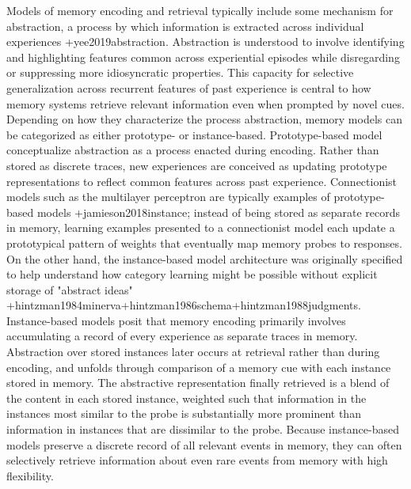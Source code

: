 Models of memory encoding and retrieval typically include some mechanism for abstraction, a process by which information is extracted across individual experiences +{}{}{yee2019abstraction}. Abstraction is understood to involve identifying and highlighting features common across experiential episodes while disregarding or suppressing more idiosyncratic properties. This capacity for selective generalization across recurrent features of past experience is central to how memory systems retrieve relevant information even when prompted by novel cues.\markdownRendererInterblockSeparator
{}Depending on how they characterize the process abstraction, memory models can be categorized as either prototype- or instance-based. Prototype-based model conceptualize abstraction as a process enacted during encoding. Rather than stored as discrete traces, new experiences are conceived as updating prototype representations to reflect common features across past experience. Connectionist models such as the multilayer perceptron are typically examples of prototype-based models +{}{}{jamieson2018instance}; instead of being stored as separate records in memory, learning examples presented to a connectionist model each update a prototypical pattern of weights that eventually map memory probes to responses.\markdownRendererInterblockSeparator
{}On the other hand, the instance-based model architecture was originally specified to help understand how category learning might be possible without explicit storage of "abstract ideas" +{}{}{hintzman1984minerva}+{}{}{hintzman1986schema}+{}{}{hintzman1988judgments}. Instance-based models posit that memory encoding primarily involves accumulating a record of every experience as separate traces in memory. Abstraction over stored instances later occurs at retrieval rather than during encoding, and unfolds through comparison of a memory cue with each instance stored in memory. The abstractive representation finally retrieved is a blend of the content in each stored instance, weighted such that information in the instances most similar to the probe is substantially more prominent than information in instances that are dissimilar to the probe. Because instance-based models preserve a discrete record of all relevant events in memory, they can often selectively retrieve information about even rare events from memory with high flexibility.\relax